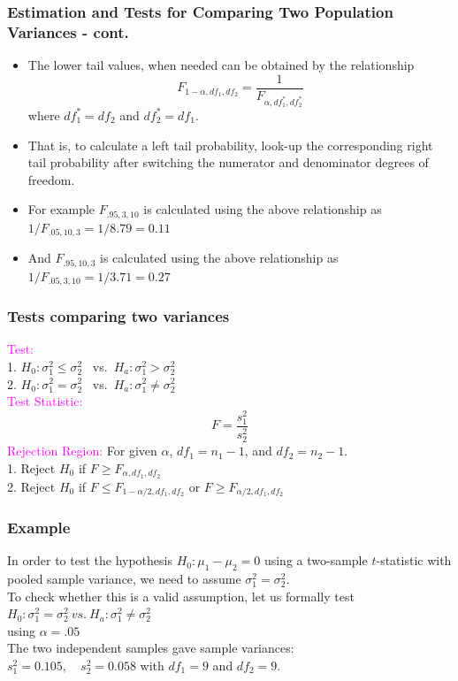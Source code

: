 \documentclass[xcolor=dvipsnames,12pt]{beamer}
\begin{document}
\begin{frame}
\frametitle{Estimation and Tests for Comparing Two
Population Variances - cont.}
\begin{itemize}
\item The lower tail values, when needed can be obtained by the
relationship
$$ F_{1-\alpha,df_1,df_2}=\frac{1}{F_{\alpha,df_1^*,df_2^*}}$$
where $df_1^*=df_2$ and $df_2^*=df_1$. 
\item That is, to calculate a left tail probability, look-up the corresponding right tail probability  after switching the numerator and denominator degrees of freedom.
\item For example $F_{.95,3,10}$ is calculated using the above relationship as $1/F_{.05,10,3}=1/8.79=0.11$
\item And $F_{.95,10,3}$ is calculated using the above relationship as $1/F_{.05,3,10}=1/3.71=0.27$
\end{itemize}
\end{frame}


\begin{frame}
\frametitle{Tests comparing two variances}
{\textcolor{magenta}{Test:}} \\[.2in]
\hspace*{.6in}1. $H_0: \sigma_1^2 \leq \sigma_2^2$ \ vs.\ $H_a:\sigma_1^2 > \sigma_2^2$\\[.1in]
\hspace*{.6in}2. $H_0:\sigma_1^2 = \sigma_2^2$ \ vs.\ $H_a: \sigma_1^2 \neq \sigma_2^2$ \\[.2in]
{\textcolor{magenta}{Test Statistic:}} 
$$
  F = \frac{s_1^2}{s_2^2} 
$$ 
{\textcolor{magenta}{Rejection Region:}}  For given $\alpha$, $df_1 = n_1-1$, and $df_2 = n_2 - 1$.\\[.1in]
\hspace*{.6in}1. Reject $H_0$ if $F \geq F_{\alpha,df_1,df_2}$\\[.2in]
\hspace*{.6in}2. Reject $H_0$ if $F \leq F_{1-\alpha/2,df_1,df_2}$
or $F\geq F_{\alpha/2,df_1,df_2}$\\[.1in]
\end{frame}

\begin{frame}
\frametitle{Example}
In order to test the hypothesis $H_0: \mu_1 - \mu_2 = 0$ using a two-sample $t$-statistic with pooled sample variance, we need to assume $\sigma_1^2 = \sigma_2^2$. \\[.1in]
To check whether this is a valid assumption, let us formally test\\[.1in]
 \hspace*{.5in} $ H_0:\sigma_1^2 = \sigma_2^2\ vs.\   H_a:  \sigma_1^2 \neq
\sigma_2^2$\\[.1in]
using $\alpha=.05$\\[.1in]
 The two independent samples gave sample variances:\\[.1in] 
$ s_1^2 = 0.105, \quad s_2^2 = 0.058 $ with $df_1=9$ and $df_2=9$.
\end{frame}
\end{document}
